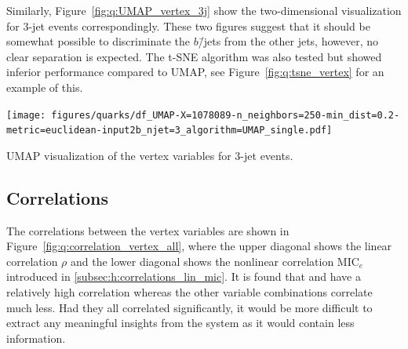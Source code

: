 Similarly, Figure~\ref{fig:q:UMAP_vertex_3j} 
show the two-dimensional visualization for 3-jet events correspondingly. These two figures suggest that it should be somewhat possible to discriminate the $b$\=/jets from the other jets, however, no clear separation is expected. The t-SNE algorithm was also tested but showed inferior performance compared to UMAP, see Figure~\ref{fig:q:tsne_vertex} for an example of this.

\begin{marginfigure}[-5mm]
  \centerfloat
  \texttt{[image: figures/quarks/df\_UMAP-X=1078089-n\_neighbors=250-min\_dist=0.2-metric=euclidean-input2b\_njet=3\_algorithm=UMAP\_single.pdf]}
  \vspace{1mm}
  \caption[UMAP Visualization of the Vertex Variables for 3-Jet Events]
          {UMAP visualization of the vertex variables for 3-jet events.} 
  \label{fig:q:UMAP_vertex_3j}
\end{marginfigure}




\subsection{Correlations}

The correlations between the vertex variables are shown in Figure~\ref{fig:q:correlation_vertex_all}, where the upper diagonal shows the linear correlation $\rho$ and the lower diagonal shows the nonlinear correlation $\mathrm{MIC}_e$ introduced in \autoref{subsec:h:correlations_lin_mic}. It is found that  and  have a relatively high correlation whereas the other variable combinations correlate much less. Had they all correlated significantly, it would be more difficult to extract any meaningful insights from the system as it would contain less information. 

